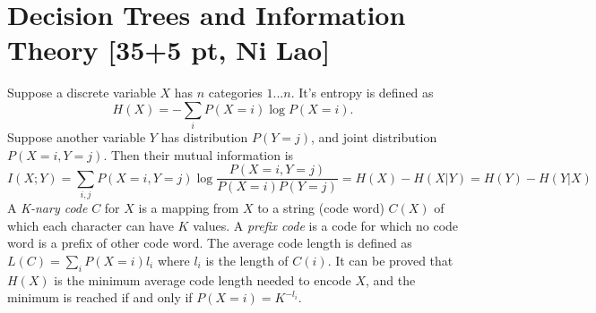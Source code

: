 \documentclass[11pt]{article}
\begin{document}
\section{Decision Trees and Information Theory [35+5 pt, Ni Lao]}
Suppose a discrete variable $X$ has $n$ categories $1...n$. It's entropy is defined as \begin{displaymath}
H(X)=-\sum_i {P(X=i)\log{P(X=i)}}.
\end{displaymath}
Suppose another variable $Y$ has distribution $P(Y=j)$, and
joint distribution $P(X=i,Y=j)$. Then their mutual information is
\begin{displaymath}
I(X;Y)=\sum_{i,j} P(X=i,Y=j) \log \frac{P(X=i,Y=j)}{P(X=i) P(Y=j)}=H(X)-H(X|Y)=H(Y)-H(Y|X)
\end{displaymath}
A \textit{K-nary code} $C$ for $X$ is a mapping from $X$ to a string
(code word) $C(X)$ of which each character can have $K$ values. A
\textit{prefix code} is a code for which no code word is a prefix of
other code word. The average code length is defined as $L(C)=\sum_i {P(X=i) l_i}$
where $l_i$ is the length of $C(i)$. It can be proved that $H(X)$ is
the minimum average code length needed to encode $X$, and the
minimum is reached if and only if $P(X=i)= K^{-l_i}$.
\end{document}
